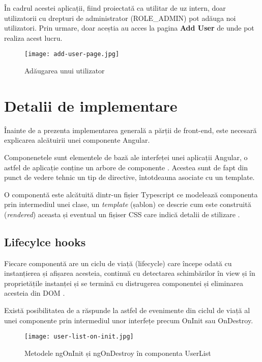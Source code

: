 În cadrul acestei aplicații, fiind proiectată ca utilitar de uz intern, doar utilizatorii cu drepturi de administrator (ROLE\_ADMIN) pot adăuga noi utilizatori. Prin urmare, doar aceștia au acces la pagina \textbf{Add User} de unde pot realiza acest lucru.

\begin{figure}[H]
	\centering
	\texttt{[image: add-user-page.jpg]}
	\caption{Adăugarea unui utilizator}
\end{figure}

\section{Detalii de implementare}

Înainte de a prezenta implementarea generală a părții de front-end, este necesară explicarea alcătuirii unei componente Angular.

Componenetele sunt elementele de bază ale interfeței unei aplicații Angular, o astfel de aplicație conține un arbore de componente \cite{component1}. Acestea sunt de fapt din punct de vedere tehnic un tip de directive, întotdeauna asociate cu un template.

O componentă este alcătuită dintr-un fișier Typescript ce modelează componenta prin intermediul unei clase, un \textit{template} (șablon) ce descrie cum este construită (\textit{rendered}) aceasta și eventual un fișiser CSS care indică detalii de stilizare \cite{angular-basic}.

\subsection{Lifecylce hooks}

Fiecare componentă are un ciclu de viață (lifecycle) care începe odată cu instanțierea și afișarea acesteia, continuă cu detectarea schimbărilor în view și în proprietățile instanței și se termină cu distrugerea componentei și eliminarea acesteia din DOM \cite{angular-lifecycle}.

Există posibilitatea de a răspunde la astfel de evenimente din ciclul de viață al unei componente prin intermediul unor interfețe precum OnInit sau OnDestroy.

\begin{figure}[H]
	\centering
	\texttt{[image: user-list-on-init.jpg]}
	\caption{Metodele ngOnInit și ngOnDestroy în componenta UserList}
\end{figure}

